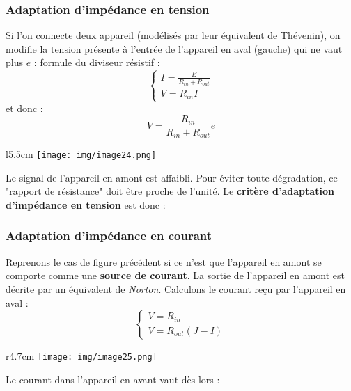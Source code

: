 \subsubsection{Adaptation d'impédance en tension}
Si l'on connecte deux appareil (modélisés par leur équivalent de Thévenin), on modifie la tension présente à l'entrée de l'appareil en aval (gauche) qui ne vaut plus $e$ : formule du diviseur résistif :
\begin{equation}
\left\{\begin{array}{l}
I = \frac{E}{R_{in} + R_{out}}\\
V = R_{in} I
\end{array}\right.
\end{equation}
et donc : 
\begin{equation}
V = \frac{R_{in}}{R_{in} + R_{out}}e
\end{equation}
\begin{wrapfigure}[5]{l}{5.5cm}
\texttt{[image: img/image24.png]}
\end{wrapfigure}
Le signal de l'appareil en amont est affaibli. Pour éviter toute dégradation, ce "rapport de résistance" doit être proche de l'unité. Le \textbf{critère d'adaptation d'impédance en tension} est donc :\\


\subsubsection{Adaptation d'impédance en courant}
Reprenons le cas de figure précédent si ce n'est que l'appareil en amont se comporte comme une \textbf{source de courant}. La sortie de l'appareil en amont est décrite par un équivalent de \textit{Norton}. Calculons le courant reçu  par l'appareil en aval :
\begin{equation}
\left\{\begin{array}{l}
V = R_{in}\\
V = R_{out}(J-I)
\end{array}\right.
\end{equation}
\begin{wrapfigure}[6]{r}{4.7cm}
\texttt{[image: img/image25.png]}
\end{wrapfigure}
Le courant dans l'appareil en avant vaut dès lors :

